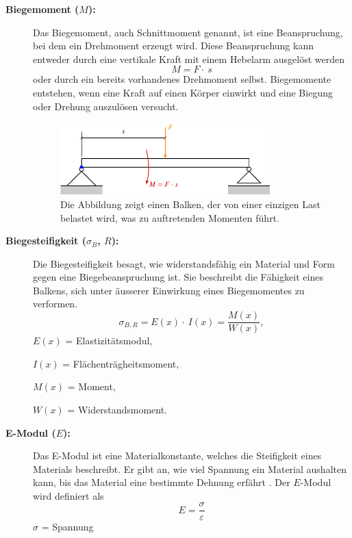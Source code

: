 \begin{description}
\item[\textbf{Biegemoment ($M$):}] Das Biegemoment, auch Schnittmoment genannt, ist eine Beanspruchung, bei dem ein Drehmoment erzeugt wird.
Diese Beanspruchung kann entweder durch eine vertikale Kraft mit einem Hebelarm ausgelöst werden
\begin{equation}
	M=
	F\cdot\ s
\end{equation}
oder durch ein bereits vorhandenes Drehmoment selbst.
Biegemomente entstehen, wenn eine Kraft auf einen Körper einwirkt und eine Biegung oder Drehung auszulösen versucht.
\begin{figure}
	\centering
	\includegraphics[width=0.8\textwidth]{papers/balken/images/teil1/Biegemoment.pdf}
	\caption{Die Abbildung zeigt einen Balken, der von einer einzigen Last belastet wird, was zu auftretenden Momenten führt.}
	\label{fig:Die Abbildung zeigt einen Balken, der von einer einzigen Last belastet wird, was zu auftretenden Momenten führt.}
\end{figure}

\item[\textbf{Biegesteifigkeit ($σ_B$, $R$):}] Die Biegesteifigkeit besagt, wie widerstandsfähig ein Material und Form gegen eine Biegebeanspruchung ist.
%
Sie beschreibt die Fähigkeit eines Balkens, sich unter äusserer Einwirkung eines Biegemomentes zu verformen.
\begin{equation}
\sigma_{B,R}=E
\left(x\right)\cdot\ I\left(x\right)=
\frac{M(x)}{W(x)},
\end{equation}
$E(x)$ = Elastizitätsmodul,

$I(x)$ = Flächenträgheitsmoment,

$M(x)$ = Moment,

$W(x)$ = Widerstandsmoment.

\item[\textbf{E-Modul ($E$):}] Das E-Modul ist eine Materialkonstante, welches die Steifigkeit eines Materials beschreibt.
%
Er gibt an, wie viel Spannung ein Material aushalten kann, bis das Material eine bestimmte Dehnung erfährt \cite{balken:Elastizitaetsmodul}.
Der $E$-Modul wird definiert als
\begin{equation}
E=
\frac{\sigma}{\varepsilon}
\end{equation}
$\sigma$ = Spannung


\end{description}
